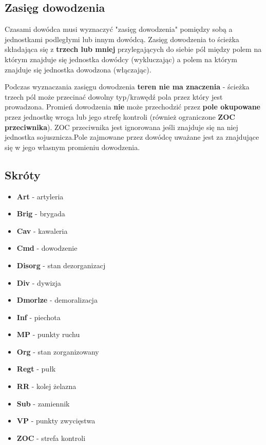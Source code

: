 \subsection{Zasięg dowodzenia}
Czasami dowódca musi wyznaczyć "zasięg dowodzenia" pomiędzy sobą a jednostkami podległymi lub innym dowódcą. Zasięg dowodzenia to ścieżka składająca się z \textbf{trzech lub mniej} przylegających do siebie pól między polem na którym znajduje się jednostka dowódcy (wykluczając) a polem na którym znajduje się jednostka dowodzona (włączając).\par
Podczas wyznaczania zasięgu dowodzenia \textbf{teren nie ma znaczenia} - ścieżka trzech pól może przecinać dowolny typ/krawędź pola przez który jest prowadzona. Promień dowodzenia \textbf{nie} może przechodzić przez \textbf{pole okupowane} przez jednostkę wroga lub jego strefę kontroli (również ograniczone \textbf{ZOC przeciwnika}). ZOC przeciwnika jest ignorowana jeśli znajduje się na niej jednostka sojusznicza.Pole zajmowane przez dowódcę uważane jest za znajdujące się w jego własnym promieniu dowodzenia.

\subsection{Skróty}
\begin{itemize}
  \item[] \textbf{Art} - artyleria
  \item[] \textbf{Brig} - brygada
  \item[] \textbf{Cav} - kawaleria
  \item[] \textbf{Cmd} - dowodzenie
  \item[] \textbf{Disorg} - stan dezorganizacj
  \item[] \textbf{Div} - dywizja
  \item[] \textbf{Dmorlze} - demoralizacja
  \item[] \textbf{Inf} - piechota
  \item[] \textbf{MP} - punkty ruchu
  \item[] \textbf{Org} - stan zorganizowany
  \item[] \textbf{Regt} - pułk
  \item[] \textbf{RR} - kolej żelazna
  \item[] \textbf{Sub} - zamiennik
  \item[] \textbf{VP} - punkty zwycięstwa
  \item[] \textbf{ZOC} - strefa kontroli
\end{itemize}